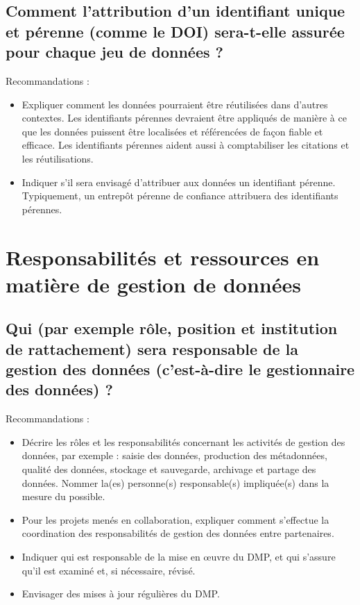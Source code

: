 \documentclass{article}
\begin{document}
\subsection{Comment l'attribution d'un identifiant unique et pérenne (comme le DOI) sera-t-elle assurée pour chaque jeu de données ?}
Recommandations :
\begin{itemize}
    \item Expliquer comment les données pourraient être réutilisées dans d'autres contextes. Les identifiants pérennes devraient être appliqués de manière à ce que les données puissent être localisées et référencées de façon fiable et efficace. Les identifiants pérennes aident aussi à comptabiliser les citations et les réutilisations.
    \item Indiquer s’il sera envisagé d’attribuer aux données un identifiant pérenne. Typiquement, un entrepôt pérenne de confiance attribuera des identifiants pérennes.
\end{itemize}

\section{Responsabilités et ressources en matière de gestion de données}
\subsection{Qui (par exemple rôle, position et institution de rattachement) sera responsable de la gestion des données (c’est-à-dire le gestionnaire des données) ?}
Recommandations :
\begin{itemize}
    \item Décrire les rôles et les responsabilités concernant les activités de gestion des données, par exemple : saisie des données, production des métadonnées, qualité des données, stockage et sauvegarde, archivage et partage des données. Nommer la(es) personne(s) responsable(s) impliquée(s) dans la mesure du possible.
    \item Pour les projets menés en collaboration, expliquer comment s’effectue la coordination des responsabilités de gestion des données entre partenaires.
    \item Indiquer qui est responsable de la mise en œuvre du DMP, et qui s'assure qu'il est examiné et, si nécessaire, révisé.
    \item Envisager des mises à jour régulières du DMP.
\end{itemize}
\end{document}
